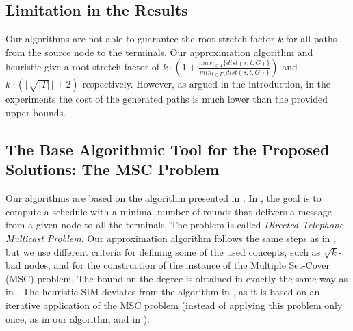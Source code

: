 
\subsection{Limitation in the Results}
Our algorithms are not able to guarantee the root-stretch factor $k$ for all paths from the source node to the terminals. 
Our approximation algorithm and heuristic give a root-stretch factor of 
$k \cdot \left(1 + \frac{max_{t\in T}\{dist(s,t,G)\}}{min_{t \in T}\{dist(s,t,G)\}}\right)$ and $k \cdot (\lfloor\sqrt{|T|}\rfloor+2)$ respectively.
However, as argued in the introduction, 
in the experiments the cost of the generated paths is much lower than the provided upper bounds.

\subsection{The Base Algorithmic Tool for the Proposed Solutions: The MSC Problem}
Our algorithms are based on the algorithm presented in \cite{Elkin2006}. In \cite{Elkin2006}, the goal is to compute a schedule
with a minimal number of rounds that delivers a message from a given node to all the terminals. The problem is called \emph{Directed Telephone Multicast Problem}. 
Our approximation algorithm follows the same steps as in 
\cite{Elkin2006}, but we use different criteria for defining some of the used concepts, such as $\sqrt{k}$-bad nodes, and for the
construction of the instance of the Multiple Set-Cover (MSC) problem. The bound on the degree
is obtained in exactly the same way as in \cite{Elkin2006}. The heuristic SIM deviates from the algorithm in \cite{Elkin2006}, as it is based on an iterative application
of the MSC problem (instead of applying this problem only once, as in our algorithm and in \cite{Elkin2006}).

